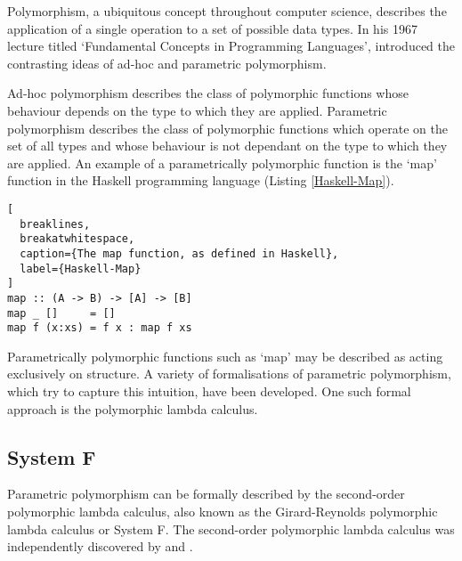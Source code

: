 \documentclass[../../Dissertation.tex]{subfiles}
\begin{document}
Polymorphism, a ubiquitous concept throughout computer science, describes the application of a single operation to a set of possible data types. In his 1967 lecture titled `Fundamental Concepts in Programming Languages',  introduced the contrasting ideas of ad-hoc and parametric polymorphism.
\par
Ad-hoc polymorphism describes the class of polymorphic functions whose behaviour depends on the type to which they are applied. Parametric polymorphism describes the class of polymorphic functions which operate on the set of all types and whose behaviour is not dependant on the type to which they are applied. An example of a parametrically polymorphic function is the `map' function in the Haskell programming language (Listing \ref{Haskell-Map}).
\begin{lstlisting}[
  breaklines,
  breakatwhitespace,
  caption={The map function, as defined in Haskell},
  label={Haskell-Map}
]
map :: (A -> B) -> [A] -> [B]
map _ []     = []
map f (x:xs) = f x : map f xs
\end{lstlisting}
Parametrically polymorphic functions such as `map' may be described as acting exclusively on structure. A variety of formalisations of parametric polymorphism, which try to capture this intuition, have been developed. One such formal approach is the polymorphic lambda calculus.

\subsection{System F}
Parametric polymorphism can be formally described by the second-order polymorphic lambda calculus, also known as the Girard-Reynolds polymorphic lambda calculus or System F. The second-order polymorphic lambda calculus was independently discovered by  and .
\end{document}
